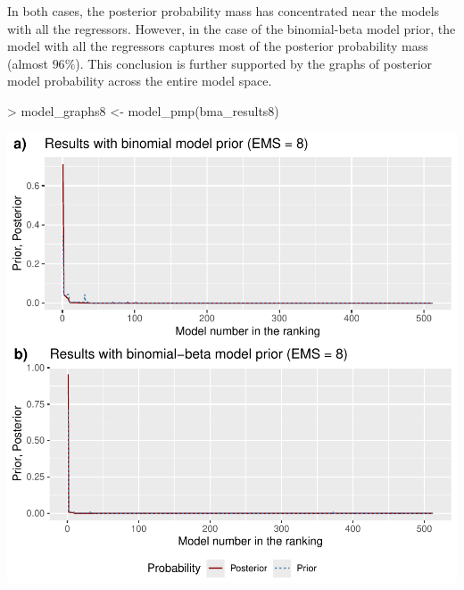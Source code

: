 \documentclass[a4paper]{article}
\begin{document}
In both cases, the posterior probability mass has concentrated near the models with all the regressors. However, in the case of the binomial-beta model prior, the model with all the regressors captures most of the posterior probability mass (almost $96\%$). This conclusion is further supported by the graphs of posterior model probability across the entire model space.
\begin{Schunk}
\begin{Sinput}
> model_graphs8 <- model_pmp(bma_results8)
\end{Sinput}
\end{Schunk}
\includegraphics{bdsm_vignette-035}
\end{document}
